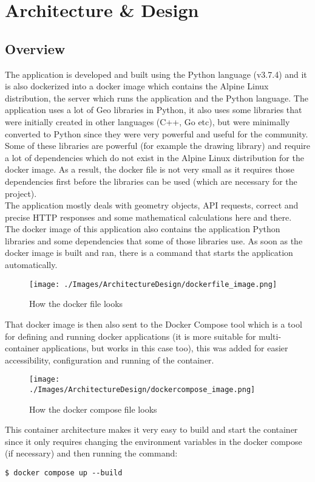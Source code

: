 \chapter{Architecture \& Design}
\section{Overview}
The application is developed and built using the Python language (v3.7.4) and it is also dockerized into a docker image which contains the Alpine Linux distribution, the server which runs the application and the Python language. 
The application uses a lot of Geo libraries in Python, it also uses some libraries that were initially created in other languages (C++, Go etc), but were minimally converted to Python since they were very powerful and useful for the community.
Some of these libraries are powerful (for example the drawing library) and require a lot of dependencies which do not exist in the Alpine Linux distribution for the docker image. As a result, the docker file is not very small as it requires those dependencies first before the libraries can be used (which are necessary for the project).\\
The application mostly deals with geometry objects, API requests, correct and precise HTTP responses and some mathematical calculations here and there.\\
\newline
The docker image of this application also contains the application Python libraries and some dependencies that some of those libraries use.
As soon as the docker image is built and ran, there is a command that starts the application automatically.
\newline
\begin{figure}[H]
	\texttt{[image: ./Images/ArchitectureDesign/dockerfile\_image.png]}
	\caption{How the docker file looks}
\end{figure}
That docker image is then also sent to the Docker Compose tool which is a tool for defining and running docker applications (it is more suitable for multi-container applications, but works in this case too), this was added for easier accessibility, configuration and running of the container.
\newline
\begin{figure}[H]
	\texttt{[image: ./Images/ArchitectureDesign/dockercompose\_image.png]}
	\caption{How the docker compose file looks}
\end{figure}
This container architecture makes it very easy to build and start the container since it only requires changing the environment variables in the docker compose (if necessary) and then running the command:
\begin{verbatim}
$ docker compose up --build
\end{verbatim}
\newpage

